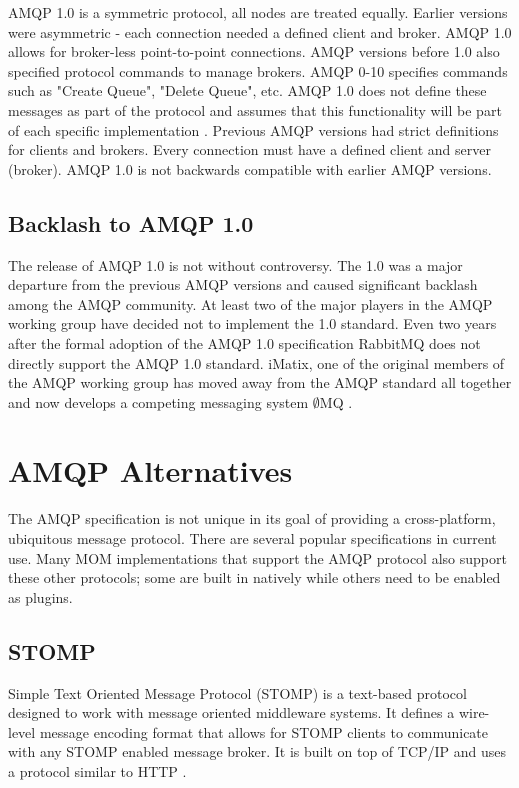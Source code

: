 \documentclass{thesis}
\begin{document}
AMQP 1.0 is a symmetric protocol, all nodes are treated equally.  Earlier versions were asymmetric - each connection needed a defined client and broker.  AMQP 1.0 allows for broker-less point-to-point connections.  AMQP versions before 1.0 also specified protocol commands to manage brokers.  AMQP 0-10 specifies commands such as "Create Queue", "Delete Queue", etc.  AMQP 1.0 does not define these messages as part of the protocol and assumes that this functionality will be part of each specific implementation \cite{REDHAT1}.  Previous AMQP versions had strict definitions for clients and brokers.  Every connection must have a defined client and server (broker).  AMQP 1.0 is not backwards compatible with earlier AMQP versions\cite{AMQP_VERSION_COMPATIBILITY}.

\subsection{Backlash to AMQP 1.0}
The release of AMQP 1.0 is not without controversy.  The 1.0 was a major departure from the previous AMQP versions and caused significant backlash among the AMQP community.  At least two of the major players in the AMQP working group have decided not to implement the 1.0 standard.  Even two years after the formal adoption of the AMQP 1.0 specification RabbitMQ does not directly support the AMQP 1.0 standard.  iMatix, one of the original members of the AMQP working group has moved away from the AMQP standard all together and now develops a competing messaging system $\emptyset$MQ \cite{ZERO_MQ, openamq-eol}. 

\section{AMQP Alternatives}
The AMQP specification is not unique in its goal of providing a cross-platform, ubiquitous message protocol.  There are several popular specifications in current use.  Many MOM implementations that support the AMQP protocol also support these other protocols; some are built in natively while others need to be enabled as plugins.   

\subsection{STOMP}
Simple Text Oriented Message Protocol (STOMP) is a text-based protocol designed to work with message oriented middleware systems.  It defines a wire-level message encoding format that allows for STOMP clients to communicate with any STOMP enabled message broker.  It is built on top of TCP/IP and uses a protocol similar to HTTP \cite{STOMP}.
\end{document}
